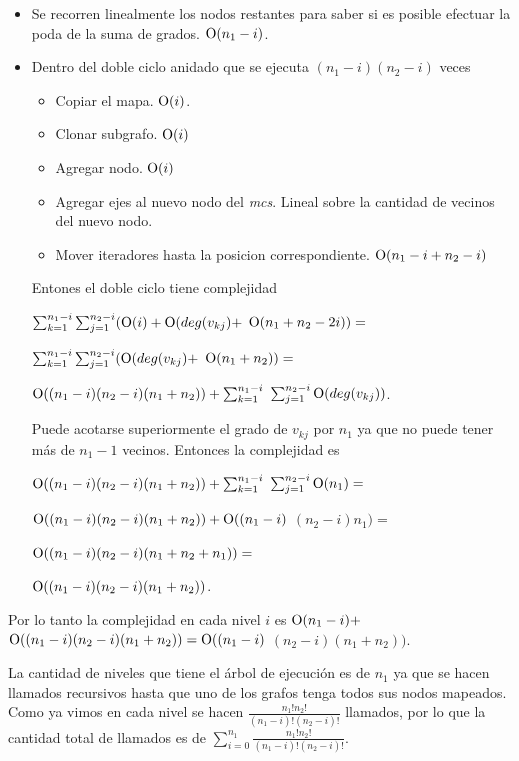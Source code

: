 \begin{itemize}
\item Se recorren linealmente los nodos restantes para saber si es posible
efectuar la poda de la suma de grados. $\operatorname{O}(n_1 - i)$.
\item Dentro del doble ciclo anidado que se ejecuta
$(n_1 - i)  (n_2 - i)$ veces
\begin{itemize}
\item Copiar el mapa. $\operatorname{O}(i)$.
\item Clonar subgrafo. $\operatorname{O}(i)$
\item Agregar nodo. $\operatorname{O}(i)$
\item Agregar ejes al nuevo nodo del \textit{mcs}. Lineal sobre la cantidad de
vecinos del nuevo nodo.
\item Mover iteradores hasta la posicion correspondiente.
$\operatorname{O}(n_1 - i + n_2 - i)$
\end{itemize}
Entones el doble ciclo tiene complejidad

$\sum_{k = 1}^{n_1 - i} \sum_{j = 1}^{n_2 - i} (\operatorname{O}(i) + \operatorname{O}(deg(v_{kj}) +$
$ \operatorname{O}(n_1 + n_2 - 2i))=$

$\sum_{k = 1}^{n_1 - i} \sum_{j = 1}^{n_2 - i} (\operatorname{O}(deg(v_{kj}) +$
$ \operatorname{O}(n_1 + n_2))=$

$\operatorname{O}((n_1 - i)  (n_2 - i)  (n_1 + n_2)) + \sum_{k = 1}^{n_1 - i}$
$ \sum_{j = 1}^{n_2 - i} \operatorname{O}(deg(v_{kj}))$.

Puede acotarse superiormente el grado de $v_{kj}$ por $n_1$ ya que no puede
tener más de $n_1 - 1$ vecinos. Entonces la complejidad es

$\operatorname{O}((n_1 - i)  (n_2 - i)  (n_1 + n_2)) + \sum_{k = 1}^{n_1 - i}$
$\sum_{j = 1}^{n_2 - i} \operatorname{O}(n_1)=$

$\operatorname{O}((n_1 - i)  (n_2 - i)  (n_1 + n_2)) + \operatorname{O}((n_1 - i) $
$(n_2 - i)  n_1)=$

$\operatorname{O}((n_1 - i)  (n_2 - i)  (n_1 + n_2 + n_1))=$

$\operatorname{O}((n_1 - i)  (n_2 - i)  (n_1 + n_2))$.
\end{itemize}

Por lo tanto la complejidad en cada nivel $i$ es $\operatorname{O}(n_1 - i) +$
$\operatorname{O}((n_1 - i)  (n_2 - i)  (n_1 + n_2)) = \operatorname{O}((n_1 - i) $
$ (n_2 - i)  (n_1 + n_2))$.

La cantidad de niveles que tiene el árbol de ejecución es de $n_1$ ya que se
hacen llamados recursivos hasta que uno de los grafos tenga todos sus nodos
mapeados. Como ya vimos en cada nivel se hacen
$\frac{n_1!  n_2!}{(n_1 - i)!  (n_2 - i)!}$ llamados, por lo que
la cantidad total de llamados es de
$\sum_{i = 0}^{n_1} \frac{n_1!  n_2!}{(n_1 - i)!  (n_2 - i)!}$.

